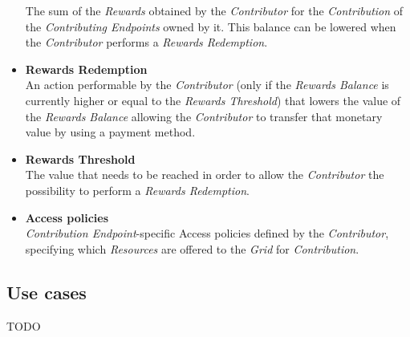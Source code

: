 \begin{itemize}
    The sum of the \textit{Rewards} obtained by the \textit{Contributor} for the \textit{Contribution} of the \textit{Contributing Endpoints} owned by it. This balance can be lowered when the \textit{Contributor} performs a \textit{Rewards Redemption}. 
    \item \textbf{Rewards Redemption}\label{rewards_redemption}\\
    An action performable by the \textit{Contributor} (only if the \textit{Rewards Balance} is currently higher or equal to the \textit{Rewards Threshold}) that lowers the value of the \textit{Rewards Balance} allowing the \textit{Contributor} to transfer that monetary value by using a payment method.
    \item \textbf{Rewards Threshold}\label{rewards_threshold}\\
    The value that needs to be reached in order to allow the \textit{Contributor} the possibility to perform a \textit{Rewards Redemption}.
    \item \textbf{Access policies}\label{access_policies}\\
    \textit{Contribution Endpoint}-specific Access policies defined by the \textit{Contributor}, specifying which \textit{Resources} are offered to the \textit{Grid} for \textit{Contribution}.
\end{itemize}

\subsection{Use cases}
TODO


